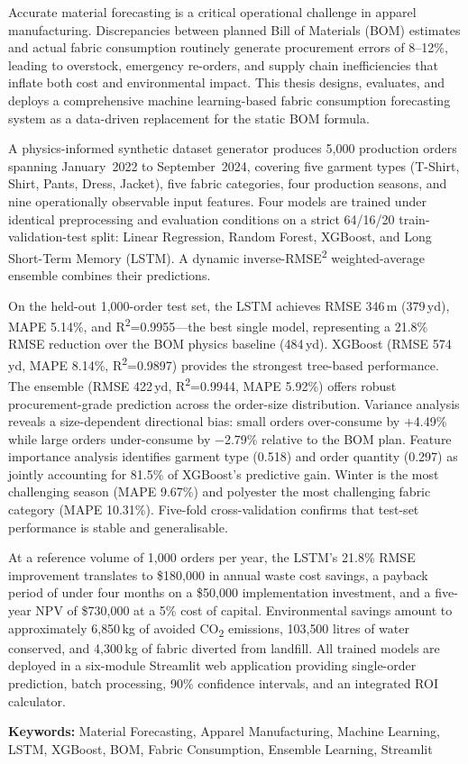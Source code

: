 Accurate material forecasting is a critical operational challenge in apparel manufacturing. Discrepancies between planned Bill of Materials (BOM) estimates and actual fabric consumption routinely generate procurement errors of 8--12\%, leading to overstock, emergency re-orders, and supply chain inefficiencies that inflate both cost and environmental impact. This thesis designs, evaluates, and deploys a comprehensive machine learning-based fabric consumption forecasting system as a data-driven replacement for the static BOM formula.

A physics-informed synthetic dataset generator produces 5{,}000 production orders spanning January~2022 to September~2024, covering five garment types (T-Shirt, Shirt, Pants, Dress, Jacket), five fabric categories, four production seasons, and nine operationally observable input features. Four models are trained under identical preprocessing and evaluation conditions on a strict 64/16/20 train-validation-test split: Linear Regression, Random Forest, XGBoost, and Long Short-Term Memory (LSTM). A dynamic inverse-RMSE\textsuperscript{2} weighted-average ensemble combines their predictions.

On the held-out 1{,}000-order test set, the LSTM achieves RMSE 346\,m (379\,yd), MAPE 5.14\%, and R\textsuperscript{2}=0.9955---the best single model, representing a 21.8\% RMSE reduction over the BOM physics baseline (484\,yd). XGBoost (RMSE 574\,yd, MAPE 8.14\%, R\textsuperscript{2}=0.9897) provides the strongest tree-based performance. The ensemble (RMSE 422\,yd, R\textsuperscript{2}=0.9944, MAPE 5.92\%) offers robust procurement-grade prediction across the order-size distribution. Variance analysis reveals a size-dependent directional bias: small orders over-consume by $+$4.49\% while large orders under-consume by $-$2.79\% relative to the BOM plan. Feature importance analysis identifies garment type (0.518) and order quantity (0.297) as jointly accounting for 81.5\% of XGBoost's predictive gain. Winter is the most challenging season (MAPE 9.67\%) and polyester the most challenging fabric category (MAPE 10.31\%). Five-fold cross-validation confirms that test-set performance is stable and generalisable.

At a reference volume of 1{,}000 orders per year, the LSTM's 21.8\% RMSE improvement translates to \$180{,}000 in annual waste cost savings, a payback period of under four months on a \$50{,}000 implementation investment, and a five-year NPV of \$730{,}000 at a 5\% cost of capital. Environmental savings amount to approximately 6{,}850\,kg of avoided CO\textsubscript{2} emissions, 103{,}500 litres of water conserved, and 4{,}300\,kg of fabric diverted from landfill. All trained models are deployed in a six-module Streamlit web application providing single-order prediction, batch processing, 90\% confidence intervals, and an integrated ROI calculator.

\medskip
\begin{sloppypar}
\noindent\textbf{Keywords:} Material Forecasting, Apparel Manufacturing, Machine Learning, LSTM, XGBoost, BOM, Fabric Consumption, Ensemble Learning, Streamlit
\end{sloppypar}
